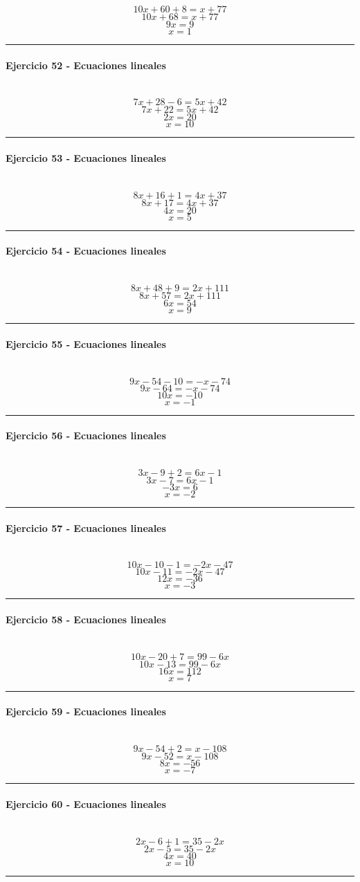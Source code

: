 \documentclass[10pt,a4paper]{article}
\newcommand{\res}[1]{\paragraph{#1}\mbox{}\\[-1.2em]}
\begin{document}
\[ 10 x + 60+8=x + 77 \]
\[ 10 x + 68=x + 77 \]
\[ 9 x=9 \]
\[ \boxed{x=1} \]
\vspace{1mm}\hrule\vspace{2mm}
\res{Ejercicio 52 - Ecuaciones lineales}
\[ 7 x + 28-6=5 x + 42 \]
\[ 7 x + 22=5 x + 42 \]
\[ 2 x=20 \]
\[ \boxed{x=10} \]
\vspace{1mm}\hrule\vspace{2mm}
\res{Ejercicio 53 - Ecuaciones lineales}
\[ 8 x + 16+1=4 x + 37 \]
\[ 8 x + 17=4 x + 37 \]
\[ 4 x=20 \]
\[ \boxed{x=5} \]
\vspace{1mm}\hrule\vspace{2mm}
\res{Ejercicio 54 - Ecuaciones lineales}
\[ 8 x + 48+9=2 x + 111 \]
\[ 8 x + 57=2 x + 111 \]
\[ 6 x=54 \]
\[ \boxed{x=9} \]
\vspace{1mm}\hrule\vspace{2mm}
\res{Ejercicio 55 - Ecuaciones lineales}
\[ 9 x - 54-10=- x - 74 \]
\[ 9 x - 64=- x - 74 \]
\[ 10 x=-10 \]
\[ \boxed{x=-1} \]
\vspace{1mm}\hrule\vspace{2mm}
\res{Ejercicio 56 - Ecuaciones lineales}
\[ 3 x - 9+2=6 x - 1 \]
\[ 3 x - 7=6 x - 1 \]
\[ - 3 x=6 \]
\[ \boxed{x=-2} \]
\vspace{1mm}\hrule\vspace{2mm}
\res{Ejercicio 57 - Ecuaciones lineales}
\[ 10 x - 10-1=- 2 x - 47 \]
\[ 10 x - 11=- 2 x - 47 \]
\[ 12 x=-36 \]
\[ \boxed{x=-3} \]
\vspace{1mm}\hrule\vspace{2mm}
\res{Ejercicio 58 - Ecuaciones lineales}
\[ 10 x - 20+7=99 - 6 x \]
\[ 10 x - 13=99 - 6 x \]
\[ 16 x=112 \]
\[ \boxed{x=7} \]
\vspace{1mm}\hrule\vspace{2mm}
\res{Ejercicio 59 - Ecuaciones lineales}
\[ 9 x - 54+2=x - 108 \]
\[ 9 x - 52=x - 108 \]
\[ 8 x=-56 \]
\[ \boxed{x=-7} \]
\vspace{1mm}\hrule\vspace{2mm}
\res{Ejercicio 60 - Ecuaciones lineales}
\[ 2 x - 6+1=35 - 2 x \]
\[ 2 x - 5=35 - 2 x \]
\[ 4 x=40 \]
\[ \boxed{x=10} \]
\vspace{1mm}\hrule\vspace{2mm}
\end{document}
